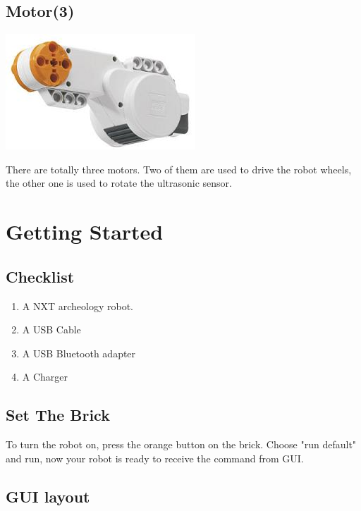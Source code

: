 \documentclass[11pt, a4paper]{report}
\begin{document}
\section{Motor(3)}
\begin{center}
\includegraphics[scale=0.8]{./image/Motor.jpg}\\[0.5cm]
\end{center}
There are totally three motors. Two of them are used to drive the robot wheels, the other one is used to rotate the ultrasonic sensor.






\chapter{Getting Started}

\section{Checklist}

\begin{enumerate}
\item A NXT archeology robot.
\item A USB Cable
\item A USB Bluetooth adapter
\item A Charger
\end{enumerate}


\section{Set The Brick}
To turn the robot on, press the orange button on the brick. Choose "run default" and run, now your robot is ready to receive the command from GUI.


\section{GUI layout}
\end{document}
